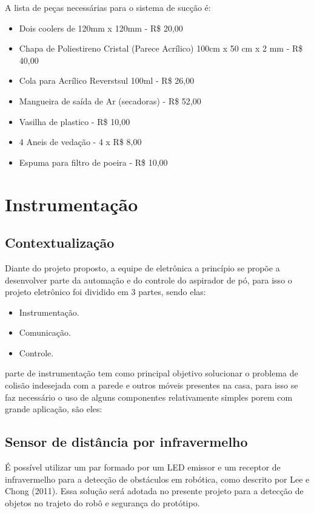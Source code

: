 			A lista de peças necessárias para o sistema de sucção é:
			\begin{itemize}
				\item Dois coolers de 120mm x 120mm - R\$ 20,00
				\item Chapa de Poliestireno Cristal (Parece Acrílico) 100cm x 50 cm x 2 mm - R\$ 40,00
				\item Cola para Acrílico Reverstsul 100ml - R\$ 26,00
				\item Mangueira de saída de Ar (secadoras) - R\$ 52,00
				\item Vasilha de plastico - R\$ 10,00
				\item 4 Aneis de vedação - 4 x R\$ 8,00
				\item Espuma para filtro de poeira - R\$ 10,00
			\end{itemize}



\section{Instrumentação} %
\subsection{Contextualização}
\label{sub:contextualização}
Diante do projeto proposto, a equipe de eletrônica a princípio se propõe a desenvolver parte da automação e do controle do aspirador de pó, para isso o projeto eletrônico foi dividido em 3 partes, sendo elas:
  \begin{itemize}
    \item Instrumentação.
    \item Comunicação.
    \item Controle.
  \end{itemize}

\label{sub:instrumentação}
 parte de instrumentação tem como principal objetivo solucionar o problema de colisão indesejada com a parede e outros móveis presentes na casa, para isso se faz necessário o uso de alguns componentes relativamente simples porem com grande aplicação, são eles:
 
  \subsection{Sensor de distância por infravermelho} 
  \label{sub:Sensor_de_distância_por_infravermelho}
    É possível utilizar um par formado por um LED emissor e um receptor de infravermelho para a detecção de obstáculos em robótica, como descrito por Lee e Chong (2011).  Essa solução será adotada no presente projeto para a detecção de objetos no trajeto do robô e segurança do protótipo.\cite{detectar_objeto}

